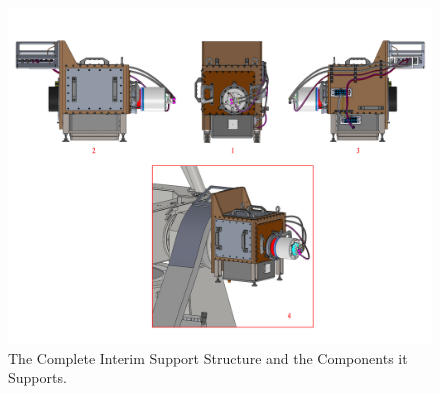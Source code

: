 \documentclass{article}
\begin{document}
\begin{figure}[p]
\begin{center}
\includegraphics[width=\linewidth]{newfigures/Fig3_2.png}
\end{center}
\caption[The Complete Interim Support Structure and the Components it Supports.]{The Complete Interim Support Structure and the Components it Supports.
}
\label{figure:alex-complete}
\end{figure}
\end{document}
